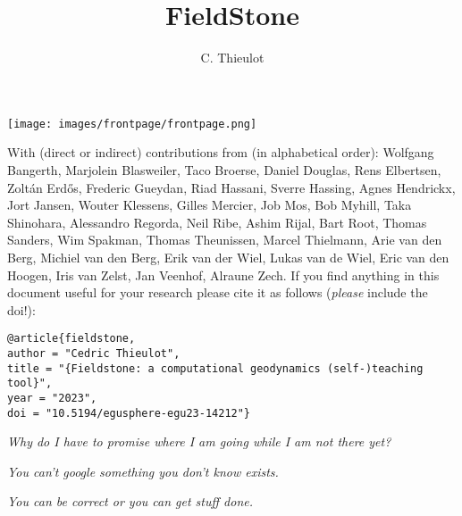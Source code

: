 \documentclass[a4paper,12pt]{report}
\title{FieldStone}
\author{C. Thieulot}
\begin{document}
\thispagestyle{empty}
\texttt{[image: images/frontpage/frontpage.png]}

{\scriptsize With (direct or indirect) contributions from (in alphabetical order): 
Wolfgang Bangerth, 
Marjolein Blasweiler,
Taco Broerse,
Daniel Douglas,
Rens Elbertsen,
Zolt{\'a}n Erd{\H{o}}s, 
Frederic Gueydan,
Riad Hassani,
Sverre Hassing,
Agnes Hendrickx,
Jort Jansen,
Wouter Klessens,
Gilles Mercier,
Job Mos, 
Bob Myhill,
Taka Shinohara, 
Alessandro Regorda,
Neil Ribe,
Ashim Rijal,
Bart Root,
Thomas Sanders,
Wim Spakman,
Thomas Theunissen,
Marcel Thielmann,
Arie van den Berg,
Michiel van den Berg,
Erik van der Wiel, 
Lukas van de Wiel, 
Eric van den Hoogen, 
Iris van Zelst,
Jan Veenhof,
Alraune Zech.}
\newpage
If you find anything in this document useful for your research please cite it 
as follows ({\it please} include the doi!):

\begin{verbatim}
@article{fieldstone,
author = "Cedric Thieulot",
title = "{Fieldstone: a computational geodynamics (self-)teaching tool}",
year = "2023",
doi = "10.5194/egusphere-egu23-14212"}
\end{verbatim}

\vspace{7cm}

\begin{center}
{\sl Why do I have to promise where I am going while I am not there yet?}

\vspace{1cm}

{\sl You can't google something you don't know exists.}

\vspace{1cm}

{\sl You can be correct or you can get stuff done.}
\end{center}

\clearpage
\tableofcontents

\end{document}
